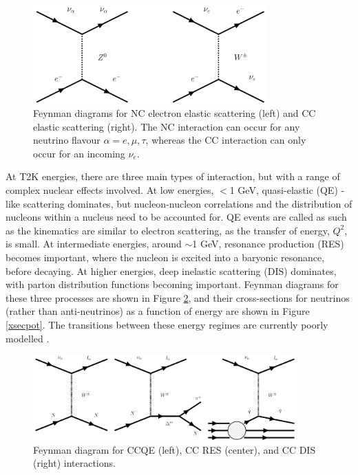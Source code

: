 \begin{figure}[!htbp]
\vspace{20pt}
\centering
\includegraphics*[width=0.8\textwidth,clip]{figs/feynmanScatt}
\caption{Feynman diagrams for NC electron elastic scattering (left) and CC elastic scattering (right). The NC interaction can occur for any neutrino flavour $\alpha = e, \mu, \tau$, whereas the CC interaction can only occur for an incoming $\nu_{e}$.} \label{Scattdiagram}
\end{figure}

At T2K energies, there are three main types of interaction, but with a range of complex nuclear effects involved. At low energies, $<$1 GeV, quasi-elastic (QE) -like scattering dominates, but nucleon-nucleon correlations and the distribution of nucleons within a nucleus need to be accounted for. QE events are called as such as the kinematics are similar to electron scattering, as the transfer of energy, $Q^2$, is small. At intermediate energies, around $\sim$1 GeV, resonance production (RES) becomes important, where the nucleon is excited into a baryonic resonance, before decaying. At higher energies, deep inelastic scattering (DIS) dominates, with parton distribution functions becoming important. Feynman diagrams for these three processes are shown in Figure \ref{feynmandiagrams}, and their cross-sections for neutrinos (rather than anti-neutrinos) as a function of energy are shown in Figure \ref{xsecpot}. The transitions between these energy regimes are currently poorly modelled \cite{models}.

\begin{figure}[!htbp]
\vspace{20pt}
\centering
\includegraphics*[width=0.9\textwidth,clip]{figs/feynmanCCs}
\caption{Feynman diagram for CCQE (left), CC RES (center), and CC DIS (right) interactions.
} \label{feynmandiagrams}
\end{figure}

